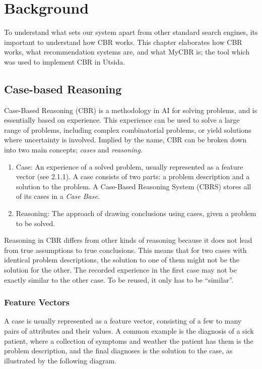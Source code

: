 \cleardoublepage

\chapter{Background}

To understand what sets our system apart from other standard search engines, its important to understand how CBR works. This chapter elaborates how CBR works, what recommendation systems are, and what MyCBR is; the tool which was used to implement CBR in Utsida.



\section{Case-based Reasoning}
Case-Based Reasoning (CBR) is a methodology in AI for solving problems, and is essentially based on experience. This experience can be used to solve a large range of problems, including complex combinatorial problems, or yield solutions where uncertainty is involved. Implied by the name, CBR can be broken down into two main concepts; \textit{cases} and \textit{reasoning}.

\begin{enumerate}
    \item Case: An experience of a solved problem, usually represented as a feature vector (see 2.1.1). A case consists of two parts: a problem description and a solution to the problem. A Case-Based Reasoning System (CBRS) stores all of its cases in a \textit{Case Base}.
    \item Reasoning: The approach of drawing conclusions using cases, given a problem to be solved.
\end{enumerate}

Reasoning in CBR differs from other kinds of reasoning because it does not lead from true assumptions to true conclusions. This means that for two cases with identical problem descriptions, the solution to one of them might not be the solution for the other. The recorded experience in the first case may not be exactly similar to the other case. To be reused, it only has to be \enquote{similar}.

\subsection{Feature Vectors}
A case is usually represented as a feature vector, consisting of a few to many pairs of attributes and their values. A common example is the diagnosis of a sick patient, where a collection of symptoms and weather the patient has them is the problem description, and the final diagnoses is the solution to the case, as illustrated by the following diagram.


